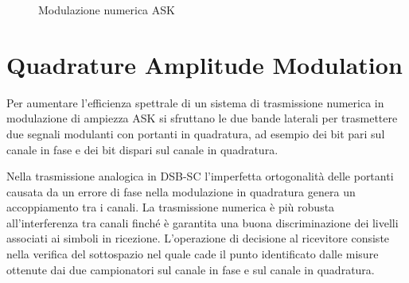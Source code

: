 \begin{figure}[ht]
{	\label{fig:ASK_modulazione}
	}\quad{}
\caption{Modulazione numerica \acf{ASK}}
\end{figure}

\section{Quadrature Amplitude Modulation}
Per aumentare l'efficienza spettrale di un sistema di trasmissione numerica in modulazione di ampiezza \ac{ASK} si sfruttano le due bande laterali per trasmettere due segnali modulanti con portanti in quadratura, ad esempio dei bit pari sul canale in fase e dei bit dispari sul canale in quadratura. 

Nella trasmissione analogica in \ac{DSB-SC} l'imperfetta ortogonalità delle portanti causata da un errore di fase nella modulazione in quadratura genera un accoppiamento tra i canali. La trasmissione numerica è più robusta all'interferenza tra canali finché è garantita una buona discriminazione dei livelli associati ai simboli in ricezione. L'operazione di decisione al ricevitore consiste nella verifica del sottospazio nel quale cade il punto identificato dalle misure ottenute dai due campionatori sul canale in fase e sul canale in quadratura.

